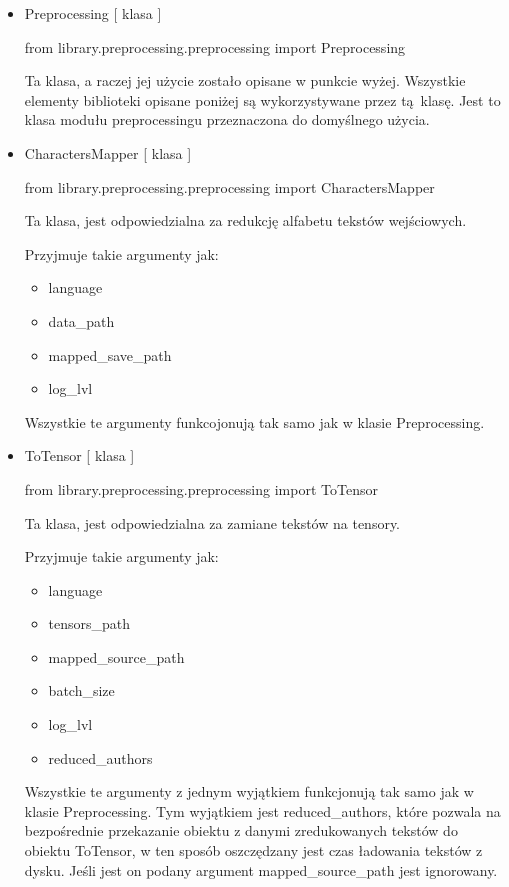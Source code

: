 \begin{itemize}
	
\item  {Preprocessing [ klasa ] }
\begin{import}
from library.preprocessing.preprocessing import Preprocessing
\end{import}

Ta klasa, a raczej jej użycie zostało opisane w punkcie wyżej. Wszystkie elementy biblioteki opisane
poniżej są wykorzystywane przez tą klasę. Jest to klasa modułu preprocessingu przeznaczona
do domyślnego użycia.

\item  {CharactersMapper [ klasa ] }
\begin{import}
from library.preprocessing.preprocessing import CharactersMapper
\end{import}
Ta klasa, jest odpowiedzialna za redukcję alfabetu tekstów wejściowych. 

Przyjmuje takie argumenty jak: 

\begin{itemize}
	\item language
	\item data\_path
	\item mapped\_save\_path
	\item log\_lvl
\end{itemize}

Wszystkie te argumenty funkcojonują tak samo jak w klasie Preprocessing.


\item  {ToTensor [ klasa ] }
\begin{import}
from library.preprocessing.preprocessing import ToTensor
\end{import}
Ta klasa, jest odpowiedzialna za zamiane tekstów na tensory.

Przyjmuje takie argumenty jak: 

\begin{itemize}
	\item language
	\item tensors\_path
	\item mapped\_source\_path
	\item batch\_size
	\item log\_lvl
	\item reduced\_authors
\end{itemize}

Wszystkie te argumenty z jednym wyjątkiem funkcjonują tak samo jak w klasie Preprocessing. 
Tym wyjątkiem jest reduced\_authors, które pozwala na bezpośrednie przekazanie obiektu z danymi 
zredukowanych tekstów do obiektu ToTensor, w ten sposób oszczędzany jest czas ładowania tekstów z 
dysku. Jeśli jest on podany argument mapped\_source\_path jest ignorowany.

\end{itemize}

